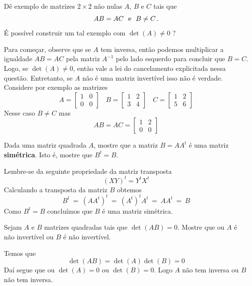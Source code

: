 \begin{problem}
Dê exemplo de matrizes $2 \times 2$ não nulas $A$, $B$ e $C$ tais que
$$AB=AC \ \  {\rm e}\ \ B \neq C\, .$$
É possível construir um tal exemplo com $\det(A) \neq 0$ ?
\end{problem}
\begin{solution}
Para começar, observe que se $A$ tem inversa, então podemos multiplicar a igualdade
$AB=AC$ pela matriz $A^{-1}$ pelo lado esquerdo para concluir que $B=C$. Logo, se $\det(A) \neq 0$, então vale a lei do cancelamento explicitada nessa questão. Entretanto, se $A$ não é uma  matriz invertível isso não é verdade. Considere por exemplo as matrizes
$$A = \left[\begin{array}{rr} 1 & 0 \\ 0 & 0 \end{array}\right]\ \ \ \ 
  B = \left[\begin{array}{rr} 1 & 2 \\ 3 & 4 \end{array}\right]\ \ \ \ 
	C = \left[\begin{array}{rr} 1 & 2 \\ 5 & 6 \end{array}\right]$$
Nesse caso $B \neq C$ mas 
$$AB = AC = \left[\begin{array}{rr} 1 & 2 \\ 0 & 0 \end{array}\right]$$
\end{solution}

\begin{problem}
Dada uma matriz quadrada $A$, mostre que a matriz $B=AA^t$ é uma matriz {\bf simétrica}. Isto é, mostre que $B^t=B$.
\end{problem}
\begin{solution}
Lembre-se da seguinte propriedade da matriz transposta
$$(XY)^t = Y^t X^t$$
Calculando a transposta da matriz $B$ obtemos
$$B^t\ =\ (A A^t)^t\ =\  \left(A^t\right)^t A^t\ =\ A A^t\ =\ B$$
Como $B^t=B$ concluímos que $B$ é uma matriz simétrica.
\end{solution}

\begin{problem}
Sejam $A$ e $B$ matrizes quadradas tais que $\det(AB)=0$. Mostre que ou $A$ é não invertível ou $B$ é não invertível.
\end{problem}
\begin{solution}
Temos que 
$$\det(AB) = \det(A) \det(B) = 0$$
Daí segue que ou $\det(A)=0$ ou $\det(B)=0$. 
Logo $A$ não tem inversa ou $B$ não tem inversa.
\end{solution}

